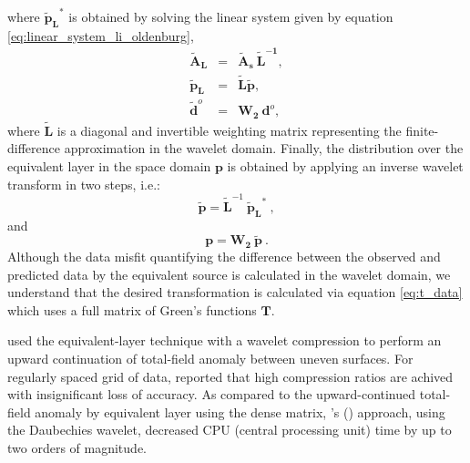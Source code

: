 where $\mathbf{\tilde{p}_{L}}^{\ast}$ is obtained by solving the linear system given by equation
\ref{eq:linear_system_li_oldenburg},
\begin{subequations}
\begin{eqnarray}
\mathbf{\tilde{A}_{L}} &=& \mathbf{\tilde{A}_{s}} \: \mathbf{\tilde{L}^{-1}}, \\
\mathbf{\tilde{p}_{L}} &=& \mathbf{\tilde{L}} \mathbf{\tilde{p}}, \\
\mathbf{\tilde{d}}^{o} &=&  \mathbf{W_2} \: \mathbf{d}^{o}, 
\end{eqnarray}
\label{eq:pl_system_li_oldenburg}
\end{subequations}
where $\mathbf{\tilde{L}}$ is a diagonal and invertible weighting matrix representing the finite-difference approximation in the wavelet domain. 
Finally, the distribution over the equivalent layer in the space domain $\mathbf{p}$ is obtained by applying an inverse wavelet transform in two steps, i.e.:
\begin{equation}
	\mathbf{\tilde{p}}  = \mathbf{\tilde{L}}^{-1} \:  \mathbf{\tilde{p}_{L}}^{\ast} \:,
	\label{eq:ptil_li_oldenburg}
\end{equation}
and
\begin{equation}
	 \mathbf{p}  = \mathbf{W_2} \: \mathbf{\tilde{p}} \:.
	\label{eq:p_li_oldenburg}
\end{equation}
Although the data misfit quantifying the difference between the observed and  predicted data 
by the equivalent source is calculated in the wavelet domain, we understand that the desired transformation
is calculated via equation \ref{eq:t_data} which  uses a full matrix of Green's functions $\mathbf{T}$.

\cite{li-oldenburg2010} used the equivalent-layer technique with a wavelet compression to perform 
an  upward continuation of total-field anomaly between uneven surfaces.
For regularly spaced grid of data,  \cite{li-oldenburg2010} reported that high compression ratios 
are achived with insignificant loss of accuracy.
As compared to the upward-continued total-field anomaly by equivalent layer using the dense matrix,
\citeauthor{li-oldenburg2010}'s (\citeyear{li-oldenburg2010}) approach, using the Daubechies wavelet,
decreased CPU (central processing unit) time by up to two orders of magnitude.

